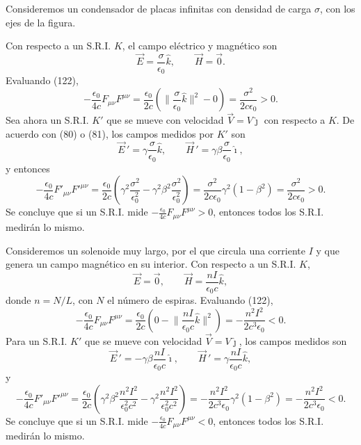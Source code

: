 \begin{ejemplo}
Consideremos un condensador de placas infinitas con densidad de carga
$\sigma$, con los ejes de la figura.

\begin{center}
\end{center}

Con respecto a un S.R.I. $K$, el campo eléctrico y magnético son
\[
\vec E=\frac{\sigma}{\epsilon_0}\hat k, \qquad \vec H=\vec0. \tag{123}
\]
Evaluando (122),
\[
-\frac{\epsilon_0}{4c}F_{\mu\nu}F^{\mu\nu}=\frac{\epsilon_0}{2c}\left(
\Big\|\frac{\sigma}{\epsilon_0}\hat k\Big\|^2-0\right)=\frac{\sigma^2}
{2c\epsilon_0}>0. \tag{124}
\]
Sea ahora un S.R.I. $K'$ que se mueve con velocidad $\vec V=V\hat\jmath$
con respecto a $K$. De acuerdo con (80) o (81), los campos medidos por
$K'$ son
\[
\vec E\,'=\gamma\frac{\sigma}{\epsilon_0}\hat k, \qquad \vec H\,'=\gamma
\beta\frac{\sigma}{\epsilon_0}\hat\imath, \tag{125}
\]
y entonces
\[
-\frac{\epsilon_0}{4c}F'_{\mu\nu}F'^{\mu\nu}=\frac{\epsilon_0}{2c}\left(
\gamma^2\frac{\sigma^2}{\epsilon_0^2}-\gamma^2\beta^2\frac{\sigma^2}{
\epsilon_0^2}\right)=\frac{\sigma^2}{2c\epsilon_0}\gamma^2(1-\beta^2)=
\frac{\sigma^2}{2c\epsilon_0}>0. \tag{126}
\]
Se concluye que si un S.R.I. mide $-\frac{\epsilon_0}{4c}F_{\mu\nu}
F^{\mu\nu}>0$, entonces todos los S.R.I. medirán lo mismo.
\end{ejemplo}

\begin{ejemplo}[Solenoide]
Consideremos un solenoide muy largo, por el que circula una corriente
$I$ y que genera un campo magnético en su interior. Con respecto a un
S.R.I. $K$,
\[
\vec E=\vec0, \qquad \vec H=\frac{nI}{\epsilon_0c}\hat k, \tag{127}
\]
donde $n=N/L$, con $N$ el número de espiras. Evaluando (122),
\[
-\frac{\epsilon_0}{4c}F_{\mu\nu}F^{\mu\nu}=\frac{\epsilon_0}{2c}\left(0-
\Big\|\frac{nI}{\epsilon_0c}\hat k\Big\|^2\right)=-\frac{n^2I^2}{2c^3
\epsilon_0}<0. \tag{128}
\]
Para un S.R.I. $K'$ que se mueve con velocidad $\vec V=V\hat\jmath$, los
campos medidos son
\[
\vec E\,'=-\gamma\beta\frac{nI}{\epsilon_0c}\hat\imath, \qquad \vec H\,'=
\gamma\frac{nI}{\epsilon_0c}\hat k, \tag{129}
\]
y
\[
-\frac{\epsilon_0}{4c}F'_{\mu\nu}F'^{\mu\nu}=\frac{\epsilon_0}{2c}\left(
\gamma^2\beta^2\frac{n^2I^2}{\epsilon_0^2c^2}-\gamma^2\frac{n^2I^2}{
\epsilon_0^2c^2}\right)=-\frac{n^2I^2}{2c^3\epsilon_0}\gamma^2(1-\beta^2)
=-\frac{n^2I^2}{2c^3\epsilon_0}<0. \tag{130}
\]
Se concluye que si un S.R.I. mide $-\frac{\epsilon_0}{4c}F_{\mu\nu}
F^{\mu\nu}<0$, entonces todos los S.R.I. medirán lo mismo.
\end{ejemplo}

